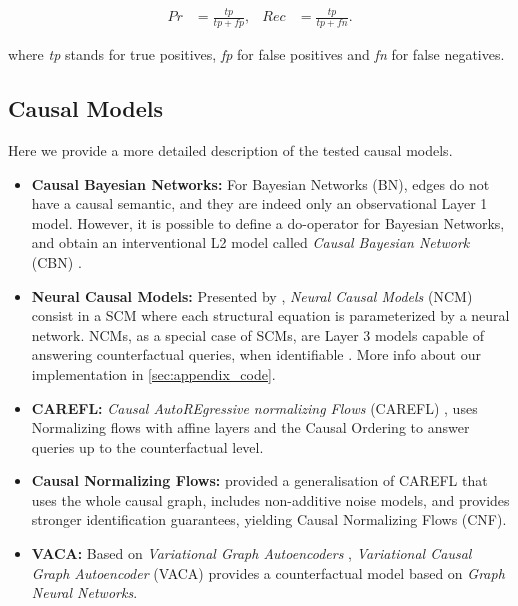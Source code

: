 \begin{align}
    Pr &= \frac{tp}{tp + fp}, &
    Rec &= \frac{tp}{tp + fn}.
\end{align}

where \textit{tp} stands for true positives, \textit{fp} for false positives and \textit{fn} for false negatives.

\subsection{Causal Models} \label{sec:appendix_causal_models}

Here we provide a more detailed description of the tested causal models.

\begin{itemize}
    \item \textbf{Causal Bayesian Networks:} For Bayesian Networks (BN), edges do not have a causal semantic, and they are indeed only an observational Layer 1 model. However, it is possible to define a do-operator for Bayesian Networks, and obtain an interventional L2 model called \textit{Causal Bayesian Network} (CBN) \citep{bareinboimpch}.
    \item \textbf{Neural Causal Models:} Presented by \cite{xia2022causalneuralconnectionexpressivenesslearnability}, \textit{Neural Causal Models} (NCM) consist in a SCM where each structural equation is parameterized by a neural network. NCMs, as a special case of SCMs, are Layer 3 models capable of answering counterfactual queries, when identifiable \citep{xia2022neuralcausalmodelscounterfactual}. More info about our implementation in \ref{sec:appendix_code}.
    \item \textbf{CAREFL:} \textit{Causal AutoREgressive normalizing Flows} (CAREFL) \citep{careflkhemakhem2021}, uses Normalizing flows with affine layers and the Causal Ordering to answer queries up to the counterfactual level.
    \item \textbf{Causal Normalizing Flows:} \citep{causalnormjavaloy2023} provided a generalisation of CAREFL that uses the whole causal graph, includes non-additive noise models, and provides stronger identification guarantees, yielding Causal Normalizing Flows (CNF).
    \item \textbf{VACA:} Based on \textit{Variational Graph Autoencoders} \citep{kipf2016variationalgraphautoencoders}, \textit{Variational Causal Graph Autoencoder} (VACA) \citep{vacasanchezmartin2021} provides a counterfactual model based on \textit{Graph Neural Networks}.
\end{itemize}

